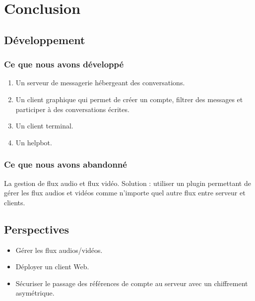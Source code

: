 \documentclass[11pt,dvipsnames,svgnames]{report}
\begin{document}
\chapter{Conclusion}
\section{Développement}
\subsection{Ce que nous avons développé}
\begin{enumerate}
\item Un serveur de messagerie hébergeant des conversations.
\item Un client graphique qui permet de créer un compte, filtrer des messages et participer à des conversations écrites.
\item Un client terminal.
\item Un helpbot.
\end{enumerate}
\subsection{Ce que nous avons abandonné}
La gestion de flux audio et flux vidéo.
Solution : utiliser un plugin permettant de gérer les flux audios et vidéos comme n'importe quel autre flux entre serveur et clients.
\section{Perspectives}
\begin{itemize}
\item Gérer les flux audios/vidéos.
\item Déployer un client Web.
\item Sécuriser le passage des références de compte au serveur avec un chiffrement asymétrique.
\end{itemize}
\end{document}

